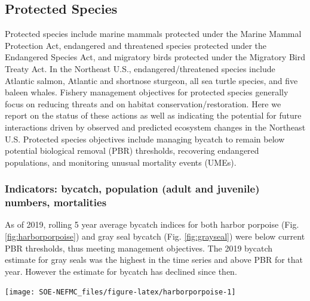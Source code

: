 \documentclass[
  10pt,
]{article}
\let\origfigure\figure
\let\endorigfigure\endfigure
\renewenvironment{figure}[1][2] {
    \expandafter\origfigure\expandafter[H]
} {
    \endorigfigure
}
\begin{document}
\hypertarget{protected-species}{%
\subsection{Protected Species}\label{protected-species}}

Protected species include marine mammals protected under the Marine Mammal Protection Act, endangered and threatened species protected under the Endangered Species Act, and migratory birds protected under the Migratory Bird Treaty Act. In the Northeast U.S., endangered/threatened species include Atlantic salmon, Atlantic and shortnose sturgeon, all sea turtle species, and five baleen whales. Fishery management objectives for protected species generally focus on reducing threats and on habitat conservation/restoration. Here we report on the status of these actions as well as indicating the potential for future interactions driven by observed and predicted ecosystem changes in the Northeast U.S. Protected species objectives include managing bycatch to remain below potential biological removal (PBR) thresholds, recovering endangered populations, and monitoring unusual mortality events (UMEs).

\hypertarget{indicators-bycatch-population-adult-and-juvenile-numbers-mortalities}{%
\subsubsection{Indicators: bycatch, population (adult and juvenile) numbers, mortalities}\label{indicators-bycatch-population-adult-and-juvenile-numbers-mortalities}}

As of 2019, rolling 5 year average bycatch indices for both harbor porpoise (Fig. \ref{fig:harborporpoise}) and gray seal bycatch (Fig. \ref{fig:grayseal}) were below current PBR thresholds, thus meeting management objectives. The 2019 bycatch estimate for gray seals was the highest in the time series and above PBR for that year. However the estimate for bycatch has declined since then.

\begin{figure}

{\centering \texttt{[image: SOE-NEFMC\_files/figure-latex/harborporpoise-1]} 

}

\caption{Harbor porpoise average bycatch estimate for Mid-Atlantic and New England fisheries (blue) and the potential biological removal (red).}\label{fig:harborporpoise}
\end{figure}
\end{document}
